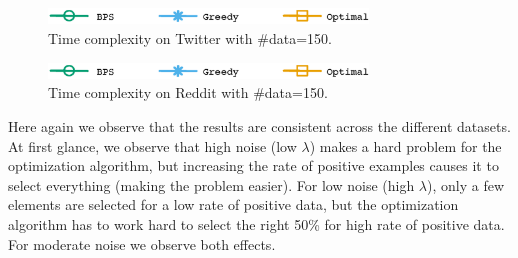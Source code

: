 \begin{figure}[H]
\begin{centering}
\includegraphics[width=8.5cm]{imgs/legend2}
\par\end{centering}
\begin{centering}
\par\end{centering}
\caption{Time complexity on Twitter with \#data=150.}
\label{fig:Time_vs_Pos_Twitter}
\end{figure}

\begin{figure}[H]
\begin{centering}
\includegraphics[width=8.5cm]{imgs/legend2}
\par\end{centering}
\begin{centering}
\par\end{centering}
\caption{Time complexity on Reddit with \#data=150.}
\label{fig:Time_vs_Pos_Reddit}
\end{figure}

Here again we observe that the results are consistent across the different datasets. 
At first glance, we observe that high noise (low $\lambda$) makes a hard problem for the optimization algorithm, but increasing the rate of positive examples causes it to select everything (making the problem easier).  For low noise (high $\lambda$), only a few elements are selected for a low rate of positive data, but the optimization algorithm has to work hard to select the right 50\% for high rate of positive data.  For moderate noise we observe both effects.



